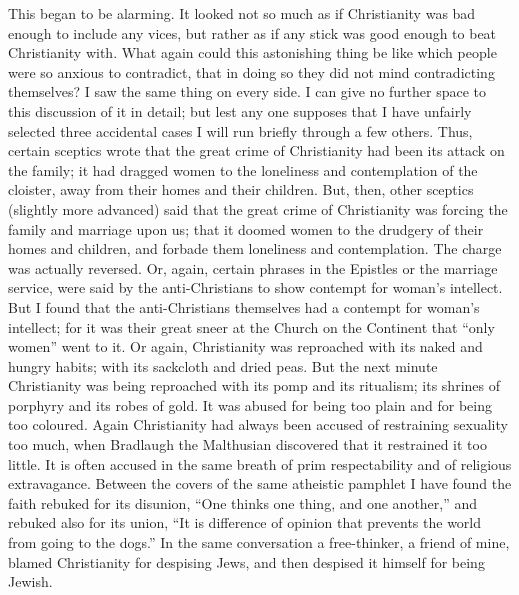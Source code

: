 This began to be alarming. It looked not so much as if Christianity was bad enough to include any vices, but rather as if any stick was good enough to beat Christianity with. What again could this astonishing thing be like which people were so anxious to contradict, that in doing so they did not mind contradicting themselves? I saw the same thing on every side. I can give no further space to this discussion of it in detail; but lest any one supposes that I have unfairly selected three accidental cases I will run briefly through a few others. Thus, certain sceptics wrote that the great crime of Christianity had been its attack on the family; it had dragged women to the loneliness and contemplation of the cloister, away from their homes and their children. But, then, other sceptics (slightly more advanced) said that the great crime of Christianity was forcing the family and marriage upon us; that it doomed women to the drudgery of their homes and children, and forbade them loneliness and contemplation. The charge was actually reversed. Or, again, certain phrases in the Epistles or the marriage service, were said by the anti-Christians to show contempt for woman’s intellect. But I found that the anti-Christians themselves had a contempt for woman’s intellect; for it was their great sneer at the Church on the Continent that “only women” went to it. Or again, Christianity was reproached with its naked and hungry habits; with its sackcloth and dried peas. But the next minute Christianity was being reproached with its pomp and its ritualism; its shrines of porphyry and its robes of gold. It was abused for being too plain and for being too coloured. Again Christianity had always been accused of restraining sexuality too much, when Bradlaugh the Malthusian discovered that it restrained it too little. It is often accused in the same breath of prim respectability and of religious extravagance. Between the covers of the same atheistic pamphlet I have found the faith rebuked for its disunion, “One thinks one thing, and one another,” and rebuked also for its union, “It is difference of opinion that prevents the world from going to the dogs.” In the same conversation a free-thinker, a friend of mine, blamed Christianity for despising Jews, and then despised it himself for being Jewish.

